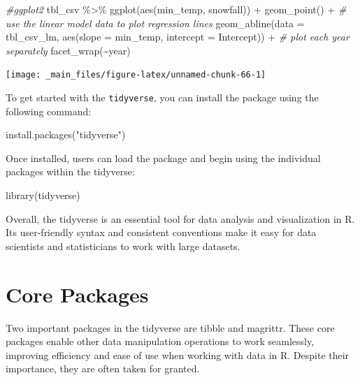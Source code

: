 \documentclass[
]{book}
\newenvironment{Shaded}{\begin{snugshade}}{\end{snugshade}}
\newcommand{\AttributeTok}[1]{\textcolor[rgb]{0.77,0.63,0.00}{#1}}
\newcommand{\CommentTok}[1]{\textcolor[rgb]{0.56,0.35,0.01}{\textit{#1}}}
\newcommand{\FunctionTok}[1]{\textcolor[rgb]{0.00,0.00,0.00}{#1}}
\newcommand{\NormalTok}[1]{#1}
\newcommand{\SpecialCharTok}[1]{\textcolor[rgb]{0.00,0.00,0.00}{#1}}
\newcommand{\StringTok}[1]{\textcolor[rgb]{0.31,0.60,0.02}{#1}}
\begin{document}
\begin{Shaded}
\begin{Highlighting}[]
\CommentTok{\#ggplot2}
\NormalTok{tbl\_csv }\SpecialCharTok{\%\textgreater{}\%}
  \FunctionTok{ggplot}\NormalTok{(}\FunctionTok{aes}\NormalTok{(min\_temp, snowfall)) }\SpecialCharTok{+} 
  \FunctionTok{geom\_point}\NormalTok{() }\SpecialCharTok{+}
  \CommentTok{\# use the linear model data to plot regression lines}
  \FunctionTok{geom\_abline}\NormalTok{(}\AttributeTok{data =}\NormalTok{ tbl\_csv\_lm,}
              \FunctionTok{aes}\NormalTok{(}\AttributeTok{slope =}\NormalTok{ min\_temp, }\AttributeTok{intercept =}\NormalTok{ Intercept)) }\SpecialCharTok{+}
  \CommentTok{\# plot each year separately }
  \FunctionTok{facet\_wrap}\NormalTok{(}\SpecialCharTok{\textasciitilde{}}\NormalTok{year)}
\end{Highlighting}
\end{Shaded}

\begin{center}\texttt{[image: \_main\_files/figure-latex/unnamed-chunk-66-1]} \end{center}

To get started with the \texttt{tidyverse}, you can install the package using the following command:

\begin{Shaded}
\begin{Highlighting}[]
\FunctionTok{install.packages}\NormalTok{(}\StringTok{"tidyverse"}\NormalTok{)}
\end{Highlighting}
\end{Shaded}

Once installed, users can load the package and begin using the individual packages within the tidyverse:

\begin{Shaded}
\begin{Highlighting}[]
\FunctionTok{library}\NormalTok{(tidyverse)}
\end{Highlighting}
\end{Shaded}

Overall, the tidyverse is an essential tool for data analysis and visualization in R. Its user-friendly syntax and consistent conventions make it easy for data scientists and statisticians to work with large datasets.

\hypertarget{core-packages}{%
\section{Core Packages}\label{core-packages}}

Two important packages in the tidyverse are tibble and magrittr. These core packages enable other data manipulation operations to work seamlessly, improving efficiency and ease of use when working with data in R. Despite their importance, they are often taken for granted.
\end{document}

